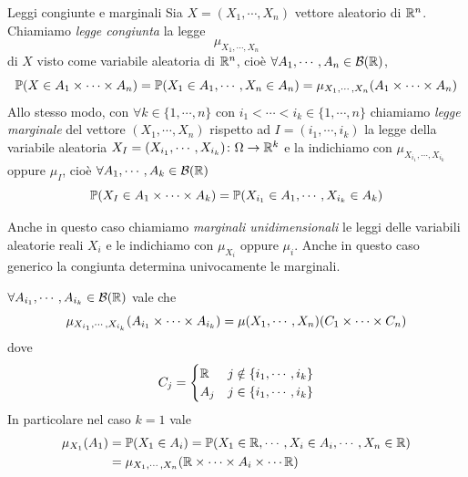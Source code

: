 \documentclass[a4paper]{article}
\begin{document}
\begin{snippetdefinition}{Leggi congiunte e marginali}
    Sia \(X = (X_1, \cdots, X_n)\) vettore aleatorio di
    \(\mathbb{R}^n\). Chiamiamo \emph{legge congiunta}
    la legge \[
        \mu_{X_1, \cdots, X_n}
    \]
    di \(X\) visto come variabile aleatoria di \(\mathbb{R}^n\),
    cioè \(\forall A_1, \cdots, A_n \in \mathcal B(\mathbb{R})\),
    \[
        \mathbb P(X \in A_1 \times \cdots \times A_n)
        = \mathbb P(X_1 \in A_1, \cdots, X_n \in A_n)
        = \mu_{X_1, \cdots, X_n}(A_1 \times \cdots \times A_n)
    \]
    Allo stesso modo, con \(\forall k \in \{1, \cdots, n\}\)
    con \(i_1 < \cdots < i_k \in \{1, \cdots, n\}\)
    chiamiamo \emph{legge marginale} del vettore \((X_1, \cdots, X_n)\)
    rispetto ad \(I = (i_1, \cdots, i_k)\) la legge della variabile
    aleatoria \(X_I = (X_{i_1}, \cdots, X_{i_k}) \colon \Omega \to \mathbb{R}^k\)
    e la indichiamo con \(\mu_{X_{i_1}, \cdots, X_{i_k}}\)
    oppure \(\mu_I\), cioè \(\forall A_1, \cdots, A_k \in \mathcal B(\mathbb{R})\)
    \[
        \mathbb P(X_I \in A_1 \times \cdots \times A_k)
        = \mathbb P(X_{i_1} \in A_1, \cdots, X_{i_k} \in A_k)
    \]
\end{snippetdefinition}

Anche in questo caso chiamiamo \emph{marginali unidimensionali}
le leggi delle variabili aleatorie reali
\(X_i\) e le indichiamo con \(\mu_{X_i}\) oppure \(\mu_i\).
Anche in questo caso generico la congiunta determina univocamente le marginali.

\begin{snippetproposition}{}
    \(\forall A_{i_1}, \cdots, A_{i_k} \in \mathcal B(\mathbb{R})\)
    vale che \[
        \mu_{X_{i_1}, \cdots, X_{i_k}}(A_{i_1} \times \cdots \times A_{i_k})
        = \mu(X_1, \cdots, X_n)(C_1 \times \cdots \times C_n)
    \]
    dove \[
        C_j =
        \begin{cases}
            \mathbb{R} & j \notin \{i_1, \cdots, i_k\} \\
            A_j & j \in \{i_1, \cdots, i_k\}
        \end{cases}
    \]
    In particolare nel caso \(k=1\) vale
    \begin{align*}
        \mu_{X_1}(A_1) &= \mathbb P(X_1\in A_i)
        = \mathbb P(X_1 \in \mathbb{R}, \cdots, X_i \in A_i, \cdots, X_n \in \mathbb{R}) \\
        &= \mu_{X_1, \cdots, X_n}(
            \mathbb{R} \times
            \cdots \times A_i \times \cdots \mathbb{R}
        )
    \end{align*}
\end{snippetproposition}
\end{document}
